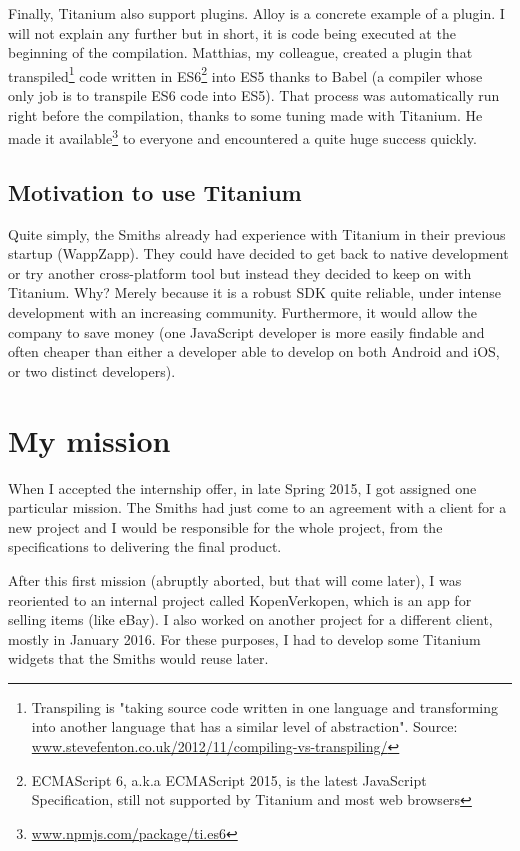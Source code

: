 Finally, Titanium also support plugins. Alloy is a concrete example of a plugin. I will not explain any further but in short, it is code being executed at the beginning of the compilation. Matthias, my colleague, created a plugin that transpiled\footnote{Transpiling is "taking source code written in one language and transforming into another language that has a similar level of abstraction". Source: \href{https://www.stevefenton.co.uk/2012/11/compiling-vs-transpiling/}{www.stevefenton.co.uk/2012/11/compiling-vs-transpiling/}} code written in ES6\footnote{ECMAScript 6, a.k.a ECMAScript 2015, is the latest JavaScript Specification, still not supported by Titanium and most web browsers} into ES5 thanks to Babel (a compiler whose only job is to transpile ES6 code into ES5). That process was automatically run right before the compilation, thanks to some tuning made with Titanium. He made it available\footnote{\href{https://www.npmjs.com/package/ti.es6}{www.npmjs.com/package/ti.es6}} to everyone and encountered a quite huge success quickly.

\subsection{Motivation to use Titanium}

Quite simply, the Smiths already had experience with Titanium in their previous startup (WappZapp). They could have decided to get back to native development or try another cross-platform tool but instead they decided to keep on with Titanium. Why? Merely because it is a robust SDK quite reliable, under intense development with an increasing community. Furthermore, it would allow the company to save money (one JavaScript developer is more easily findable and often cheaper than either a developer able to develop on both Android and iOS, or two distinct developers).

\section{My mission}

When I accepted the internship offer, in late Spring 2015, I got assigned one particular mission. The Smiths had just come to an agreement with a client for a new project and I would be responsible for the whole project, from the specifications to delivering the final product.

\medskip

After this first mission (abruptly aborted, but that will come later), I was reoriented to an internal project called KopenVerkopen, which is an app for selling items (like eBay). I also worked on another project for a different client, mostly in January 2016. For these purposes, I had to develop some Titanium widgets that the Smiths would reuse later.

